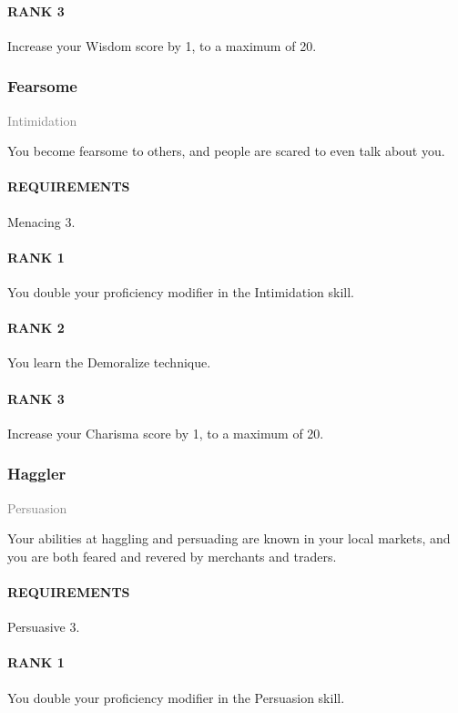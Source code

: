\paragraph{RANK 3} Increase your Wisdom score by 1, to a maximum of 20.

\subsubsection{Fearsome} \label{feat::fearsome}
\small{\textcolor{gray}{Intimidation}}

\normalsize
You become fearsome to others, and people are scared to even talk about you.
\paragraph{REQUIREMENTS} Menacing 3.
\paragraph{RANK 1} You double your proficiency modifier in the Intimidation skill.
\paragraph{RANK 2} You learn the Demoralize technique.
\paragraph{RANK 3} Increase your Charisma score by 1, to a maximum of 20.

\subsubsection{Haggler} \label{feat::haggler}
\small{\textcolor{gray}{Persuasion}}

\normalsize
Your abilities at haggling and persuading are known in your local markets, and you are both feared and revered by merchants and traders.
\paragraph{REQUIREMENTS} Persuasive 3.
\paragraph{RANK 1} You double your proficiency modifier in the Persuasion skill.
